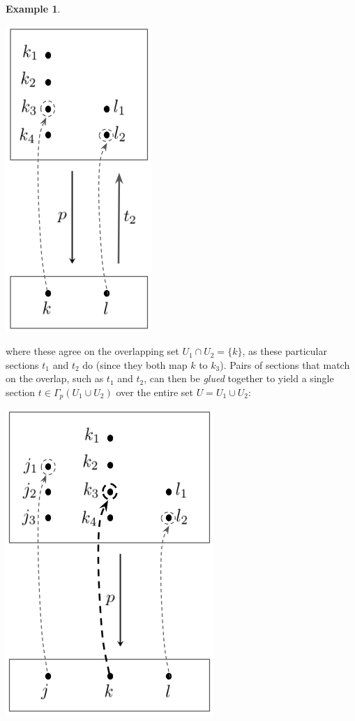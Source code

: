 \documentclass[11pt]{book}
\theoremstyle{definition}
\newtheorem{example}{Example}[section]
\theoremstyle{definition}
\theoremstyle{definition}
\theoremstyle{theorem}
\theoremstyle{definition}
\begin{document}
\begin{example}
\begin{center}
		\includegraphics*[scale=0.3]{ShortSec2.png}
	\end{center}
	where these agree on the overlapping set $U_1 \cap U_2 = \{k\}$, as these particular sections $t_1$ and $t_2$ do (since they both map $k$ to $k_3$). Pairs of sections that match on the overlap, such as $t_1$ and $t_2$, can then be \textit{glued} together to yield a single section $t \in \Gamma_p(U_1 \cup U_2)$ over the entire set $U = U_1 \cup U_2$: 
	\begin{center}
		\includegraphics*[scale=0.3]{GluedSection.png}

\end{center}
\end{example}
\end{document}
